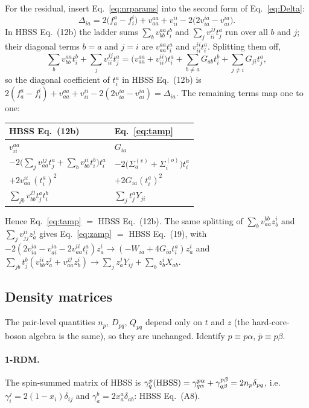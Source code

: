 \documentclass[11pt,a4paper]{article}
\newcommand{\kb}[1]{\bar{#1}}                 %
\begin{document}
For the residual, insert Eq.~\eqref{eq:nrparams} into the second form of Eq.~\eqref{eq:Delta}:
\begin{equation}
  \Delta_{ia}=2\bigl(f^a_a-f^i_i\bigr)+v^{aa}_{aa}+v^{ii}_{ii}-2\bigl(2v^{ia}_{ia}-v^{ia}_{ai}\bigr).
\end{equation}
In HBSS Eq.~(12b) the ladder sums $\sum_b v^{aa}_{bb}t^b_i$ and $\sum_j v^{jj}_{ii}t^a_j$ run over all
$b$ and $j$; their diagonal terms $b=a$ and $j=i$ are $v^{aa}_{aa}t^a_i$ and $v^{ii}_{ii}t^a_i$.
Splitting them off,
\begin{equation}
  \sum_b v^{aa}_{bb}t^b_i+\sum_j v^{jj}_{ii}t^a_j
  =\bigl(v^{aa}_{aa}+v^{ii}_{ii}\bigr)t^a_i+\sum_{b\neq a}G_{ab}t^b_i+\sum_{j\neq i}G_{ji}t^a_j ,
\end{equation}
so the diagonal coefficient of $t^a_i$ in HBSS Eq.~(12b) is
$2(f^a_a-f^i_i)+v^{aa}_{aa}+v^{ii}_{ii}-2(2v^{ia}_{ia}-v^{ia}_{ai})=\Delta_{ia}$.
The remaining terms map one to one:
\begin{center}
\begin{tabular}{ll}
\toprule
HBSS Eq.~(12b) & Eq.~\eqref{eq:tamp} \\
\midrule
$v^{aa}_{ii}$ & $G_{ia}$ \\
$-2\bigl(\sum_j v^{jj}_{aa}t^a_j+\sum_b v^{ii}_{bb}t^b_i\bigr)t^a_i$ & $-2\bigl(\Sigma^{(v)}_a+\Sigma^{(o)}_i\bigr)t^a_i$ \\
$+2v^{ii}_{aa}\,(t^a_i)^2$ & $+2G_{ia}(t^a_i)^2$ \\
$\sum_{jb}v^{jj}_{bb}t^a_jt^b_i$ & $\sum_j t^a_jY_{ji}$ \\
\bottomrule
\end{tabular}
\end{center}
Hence Eq.~\eqref{eq:tamp} $=$ HBSS Eq.~(12b). The same splitting of $\sum_b v^{bb}_{aa}z^i_b$ and
$\sum_j v^{ii}_{jj}z^j_a$ gives Eq.~\eqref{eq:zamp} $=$ HBSS Eq.~(19), with
$-2(2v^{ia}_{ia}-v^{ia}_{ai}-2v^{ii}_{aa}t^a_i)z^i_a\to(-W_{ia}+4G_{ia}t^a_i)z^i_a$ and
$\sum_{jb}t^b_j(v^{ii}_{bb}z^j_a+v^{jj}_{aa}z^i_b)\to\sum_j z^j_aY_{ij}+\sum_b z^i_bX_{ab}$.

\subsection{Density matrices}

The pair-level quantities $n_p$, $D_{pq}$, $Q_{pq}$ depend only on $t$ and $z$ (the hard-core-boson
algebra is the same), so they are unchanged. Identify $p\equiv p\alpha$, $\kb p\equiv p\beta$.

\paragraph{1-RDM.} The spin-summed matrix of HBSS is
$\gamma^p_q({\rm HBSS})=\gamma^{p\alpha}_{q\alpha}+\gamma^{p\beta}_{q\beta}=2n_p\delta_{pq}$, i.e.\
$\gamma^j_i=2(1-x_i)\delta_{ij}$ and $\gamma^b_a=2x^a_a\delta_{ab}$: HBSS Eq.~(A8).
\end{document}
